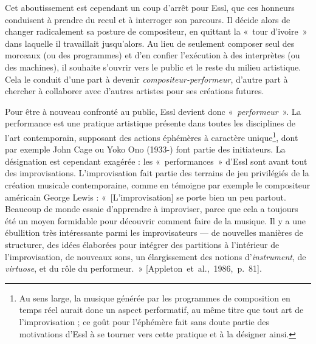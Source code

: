 \documentclass[a4paper,12pt]{article}
\newcommand{\guill}[1]{«~#1~»}
\newcommand{\cicite}[1]{{\footnotesize[#1]}}
\begin{document}
Cet aboutissement est cependant un coup d'arrêt pour Essl, que ces honneurs conduisent à prendre du recul et à interroger son parcours. Il décide alors de changer radicalement sa posture de compositeur, en quittant la \guill{tour d'ivoire} dans laquelle il travaillait jusqu'alors. Au lieu de seulement composer seul des morceaux (ou des programmes) et d'en confier l'exécution à des interprètes (ou des machines), il souhaite s'ouvrir vers le public et le reste du milieu artistique. Cela le conduit d'une part à devenir \emph{compositeur-performeur}, d'autre part à chercher à collaborer avec d'autres artistes pour ses créations futures.

Pour être à nouveau confronté au public, Essl devient donc \guill{\emph{performeur}}. La performance est une pratique artistique présente dans toutes les disciplines de l'art contemporain, supposant des actions éphémères à caractère unique\footnote{Au sens large, la musique générée par les programmes de composition en temps réel aurait donc un aspect performatif, au même titre que tout art de l'improvisation ; ce goût pour l'éphémère fait sans doute partie des motivations d'Essl à se tourner vers cette pratique et à la désigner ainsi.}, dont par exemple John Cage ou Yoko Ono (1933-) font partie des initiateurs. La désignation est cependant exagérée : les \guill{performances} d'Essl sont avant tout des improvisations. L'improvisation fait partie des terrains de jeu privilégiés de la création musicale contemporaine, comme en témoigne par exemple le compositeur américain George Lewis : \guill{[L'improvisation] se porte bien un peu partout. Beaucoup de monde essaie d'apprendre à improviser, parce que cela a toujours été un moyen formidable pour découvrir comment faire de la musique. Il y a une ébullition très intéressante parmi les improvisateurs --- de nouvelles manières de structurer, des idées élaborées pour intégrer des partitions à l'intérieur de l'improvisation, de nouveaux sons, un élargissement des notions d'\emph{instrument}, de \emph{virtuose}, et du rôle du performeur.} \cicite{Appleton~et~al.,~1986,~p.~81}.
\end{document}
